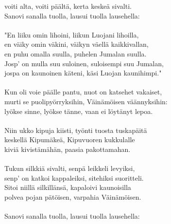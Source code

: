 voiti alta, voiti päältä, kerta keskeä sivalti.                        \\
Sanovi sanalla tuolla, lausui tuolla lausehella:                       \\
                                                                       \\
"En liiku omin lihoini, liikun Luojani lihoilla,                       \\
en väiky omin väkini, väikyn väellä kaikkivallan,                      \\
en puhu omalla suulla, puhelen Jumalan suulla.                         \\
Josp' on mulla suu suloinen, suloisempi suu Jumalan,                   \\
jospa on kaunoinen käteni, käsi Luojan kaunihimpi."                    \\
                                                                       \\
Kun oli voie päälle pantu, nuot on katsehet vakaiset,                  \\
murti se puolipyörryksihin, Väinämöisen väännyksihin:                  \\
lyökse sinne, lyökse tänne, vaan ei löytänyt lepoa.                    \\
                                                                       \\
Niin ukko kipuja kiisti, työnti tuosta tuskapäitä                      \\
keskellä Kipumäkeä, Kipuvuoren kukkulalle                              \\
kiviä kivistämähän, paasia pakottamahan.                               \\
                                                                       \\
Tukun silkkiä sivalti, senpä leikkeli levyiksi,                        \\
senp' on katkoi kappaleiksi, sitehiksi suoritteli.                     \\
Sitoi niillä silkillänsä, kapaloivi kaunoisilla                        \\
polvea pojan pätöisen, varpahia Väinämöisen.                           \\
                                                                       \\
Sanovi sanalla tuolla, lausui tuolla lausehella:                       \\
